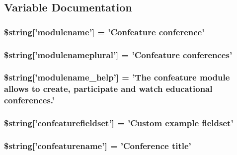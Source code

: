 \subsection{Variable Documentation}
\hypertarget{confeature_8php_a0fd1b50d5c1e8efec916b5698e4ff16d}{
\subsubsection[{\$string}]{\setlength{\rightskip}{0pt plus 5cm}\$string\mbox{[}'modulename'\mbox{]} = 'Confeature conference'}}\label{confeature_8php_a0fd1b50d5c1e8efec916b5698e4ff16d}
\hypertarget{confeature_8php_a528f8caa95b6c55ace4d8e34d268a673}{
\subsubsection[{\$string}]{\setlength{\rightskip}{0pt plus 5cm}\$string\mbox{[}'modulenameplural'\mbox{]} = 'Confeature conferences'}}\label{confeature_8php_a528f8caa95b6c55ace4d8e34d268a673}
\hypertarget{confeature_8php_af764b57ab092f5233bf21688ed375928}{
\subsubsection[{\$string}]{\setlength{\rightskip}{0pt plus 5cm}\$string\mbox{[}'modulename\-\_\-help'\mbox{]} = 'The confeature module allows to create, participate and watch educational conferences.'}}\label{confeature_8php_af764b57ab092f5233bf21688ed375928}
\hypertarget{confeature_8php_ac0695a4f2f22214e8d8f9783270f6e17}{
\subsubsection[{\$string}]{\setlength{\rightskip}{0pt plus 5cm}\$string\mbox{[}'confeaturefieldset'\mbox{]} = 'Custom example fieldset'}}\label{confeature_8php_ac0695a4f2f22214e8d8f9783270f6e17}
\hypertarget{confeature_8php_ad96fed1048b9d0a95cda3af0eb174790}{
\subsubsection[{\$string}]{\setlength{\rightskip}{0pt plus 5cm}\$string\mbox{[}'confeaturename'\mbox{]} = 'Conference title'}}\label{confeature_8php_ad96fed1048b9d0a95cda3af0eb174790}
